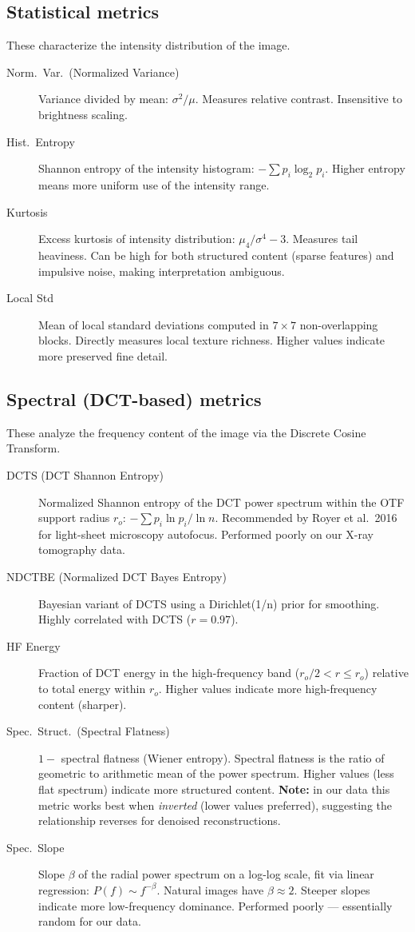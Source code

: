 \documentclass[11pt]{article}
\begin{document}
\subsection*{Statistical metrics}
These characterize the intensity distribution of the image.
\begin{description}
\item[Norm.\ Var.\ (Normalized Variance)] Variance divided by mean: $\sigma^2 / \mu$. Measures relative contrast. Insensitive to brightness scaling.
\item[Hist.\ Entropy] Shannon entropy of the intensity histogram: $-\sum p_i \log_2 p_i$. Higher entropy means more uniform use of the intensity range.
\item[Kurtosis] Excess kurtosis of intensity distribution: $\mu_4/\sigma^4 - 3$. Measures tail heaviness. Can be high for both structured content (sparse features) and impulsive noise, making interpretation ambiguous.
\item[Local Std] Mean of local standard deviations computed in $7 \times 7$ non-overlapping blocks. Directly measures local texture richness. Higher values indicate more preserved fine detail.
\end{description}

\subsection*{Spectral (DCT-based) metrics}
These analyze the frequency content of the image via the Discrete Cosine Transform.
\begin{description}
\item[DCTS (DCT Shannon Entropy)] Normalized Shannon entropy of the DCT power spectrum within the OTF support radius $r_o$: $-\sum p_i \ln p_i / \ln n$. Recommended by Royer et al.\ 2016 for light-sheet microscopy autofocus. Performed poorly on our X-ray tomography data.
\item[NDCTBE (Normalized DCT Bayes Entropy)] Bayesian variant of DCTS using a Dirichlet(1/n) prior for smoothing. Highly correlated with DCTS ($r = 0.97$).
\item[HF Energy] Fraction of DCT energy in the high-frequency band ($r_o/2 < r \leq r_o$) relative to total energy within $r_o$. Higher values indicate more high-frequency content (sharper).
\item[Spec.\ Struct.\ (Spectral Flatness)] $1 - $ spectral flatness (Wiener entropy). Spectral flatness is the ratio of geometric to arithmetic mean of the power spectrum. Higher values (less flat spectrum) indicate more structured content. \textbf{Note:} in our data this metric works best when \emph{inverted} (lower values preferred), suggesting the relationship reverses for denoised reconstructions.
\item[Spec.\ Slope] Slope $\beta$ of the radial power spectrum on a log-log scale, fit via linear regression: $P(f) \sim f^{-\beta}$. Natural images have $\beta \approx 2$. Steeper slopes indicate more low-frequency dominance. Performed poorly --- essentially random for our data.
\end{description}
\end{document}
